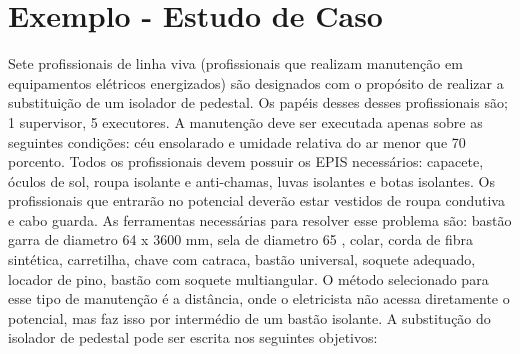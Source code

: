 \documentclass[12pt]{article}
\begin{document}
\section{Exemplo - Estudo de Caso}

Sete profissionais de linha viva (profissionais que realizam manutenção em equipamentos elétricos energizados) são designados com o propósito de realizar a substituição de um isolador de pedestal. Os papéis desses desses profissionais são; 1 supervisor, 5 executores. A manutenção deve ser executada apenas sobre as seguintes condições: céu ensolarado e umidade relativa do ar menor que 70 porcento. Todos os profissionais devem possuir os EPIS necessários: capacete, óculos de sol, roupa isolante e anti-chamas, luvas isolantes e botas isolantes. Os profissionais que entrarão no potencial deverão estar vestidos de roupa condutiva e cabo guarda. As ferramentas necessárias para resolver esse problema são: bastão garra de diametro 64 x 3600 mm, sela de diametro 65 , colar, corda de fibra sintética, carretilha, chave com catraca, bastão universal, soquete adequado, locador de pino, bastão com soquete multiangular. O método selecionado para esse tipo de manutenção é a distância, onde o eletricista não acessa diretamente o potencial, mas faz isso por intermédio de um bastão isolante. A substitução do isolador de pedestal pode ser escrita nos seguintes objetivos: 
\end{document}
